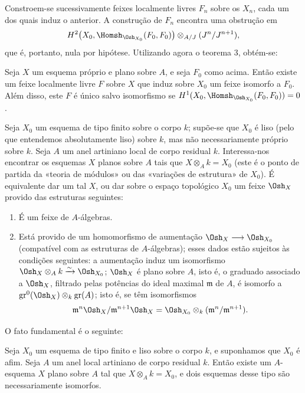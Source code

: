 Constroem-se sucessivamente feixes localmente livres $F_n$ sobre os $X_n$, cada
um dos quais induz o anterior. A construção de $F_n$ encontra uma
obstrução em
\[
  H^2\bigl(X_0,\Homsh_{\Osh_{X_0}}(F_0,F_0)\bigr)
  \otimes_{A/J}(J^n/J^{n+1}),
\]
que é, portanto, nula por hipótese. Utilizando agora o teorema 3, obtém-se:

 Seja $X$ um esquema próprio e plano sobre $A$, e seja $F_0$
como acima. Então existe um feixe localmente livre $F$ sobre $X$ que induz
sobre $X_0$ um feixe isomorfo a $F_0$. Além disso, este $F$ é único salvo
isomorfismo se
$H^1(X_0,\Homsh_{\Osh_{X_0}}(F_0,F_0))=0$.

Seja $X_0$ um esquema de tipo finito sobre o corpo $k$; supõe-se que $X_0$ é
liso (pelo que entendemos absolutamente liso) sobre $k$, mas não
necessariamente próprio sobre $k$. Seja $A$ um anel artiniano local de corpo
residual $k$. Interessa-nos encontrar os esquemas $X$ planos sobre $A$ tais que
$X\otimes_A k=X_0$ (este é o ponto de partida da «teoria de módulos» ou
das «variações de estrutura» de $X_0$). É equivalente dar um tal $X$, ou dar
sobre o espaço topológico $X_0$ um feixe $\Osh_X$ provido das estruturas
seguintes:
\begin{enumerate}
  \item[\textit{i.}] É um feixe de $A$-álgebras.
  \item[\textit{ii.}] Está provido de um homomorfismo de aumentação
    $\Osh_X\longrightarrow\Osh_{X_0}$ (compatível com as estruturas de
    $A$-álgebras); esses dados estão sujeitos às condições seguintes: a
    aumentação induz um isomorfismo
    $\Osh_X\otimes_A k\xrightarrow{\sim}\Osh_{X_0}$; $\Osh_X$ é plano sobre
    $A$, isto é, o graduado associado a $\Osh_X$, filtrado pelas potências
    do ideal maximal $\mathfrak m$ de $A$, é isomorfo a
    $\operatorname{gr}^0(\Osh_X)\otimes_k\operatorname{gr}(A)$; isto é, se
    têm isomorfismos
    \[
      \mathfrak m^n\Osh_X/\mathfrak m^{n+1}\Osh_X
      =\Osh_{X_0}\otimes_k(\mathfrak m^n/\mathfrak m^{n+1}).
    \]
\end{enumerate}
O fato fundamental é o seguinte:

 Seja $X_0$ um esquema de tipo finito e liso sobre o
corpo $k$, e suponhamos que $X_0$ é afim. Seja $A$ um anel local artiniano de
corpo residual $k$. Então existe um $A$-esquema $X$ plano sobre $A$ tal que
$X\otimes_A k=X_0$, e dois esquemas desse tipo são necessariamente isomorfos.

